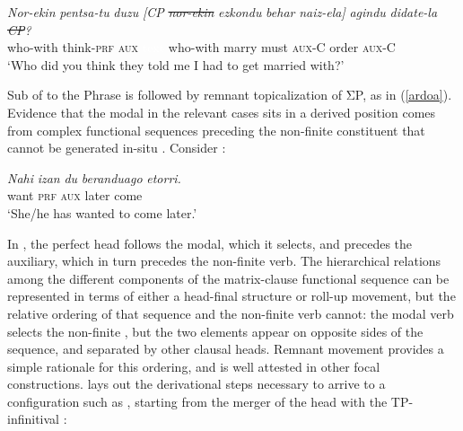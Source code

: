 \documentclass[output=paper]{langscibook}
\begin{document}
\ea \label{ex:haddican:47} 
\gll \textit{Nor-ekin} \textit{pentsa-tu} \textit{duzu} \textit{[CP} \textit{\st{nor-ekin}} \textit{ezkondu} \textit{behar} \textit{naiz-ela]} \textit{agindu} \textit{didate-la} \textit{\st{CP}?}\\
who-with think-\textsc{prf} \textsc{aux} \textcolor{white}{text}  who-with marry must \textsc{aux-C} order \textsc{aux-C}\\
\glt `Who did you think they told me I had to get married with?'
\z

Sub of  to the  Phrase is followed by remnant topicalization of ΣP, as in (\protect\ref{ardoa}). Evidence that the modal in the relevant cases sits in a derived position comes from complex functional sequences preceding the non-finite constituent that cannot be generated in-situ \citep{etxepare-uribeetxebarria2009}. Consider :

\ea \label{ex:haddican:48}
\gll \textit{Nahi} \textit{izan}   \textit{du}   \textit{beranduago} \textit{etorri.}	\\
        want \textsc{prf} \textsc{aux} later            come\\
\glt `She/he has wanted to come later.' 
\z


In , the perfect head follows the modal, which it selects, and precedes the auxiliary, which in turn precedes the non-finite verb. The hierarchical relations among the different components of the matrix-clause functional sequence can be represented in terms of either a head-final structure or roll-up movement, but the relative ordering of that sequence and the non-finite verb cannot: the modal verb selects the non-finite , but the two elements appear on opposite sides of the sequence, and separated by other clausal heads. Remnant movement provides a simple rationale for this ordering, and is well attested in other  focal constructions.  lays out the derivational steps necessary to arrive to a configuration such as , starting from the merger of the  head with the TP-infinitival :
\end{document}
